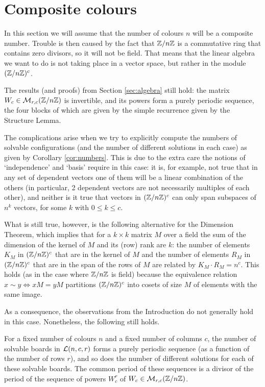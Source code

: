 \section{Composite colours}\label{sec:comp}
In this section we will assume that the number of colours $n$
will be a composite number. Trouble is then caused by the fact
that $\mathbb{Z}/n\mathbb{Z}$ is a commutative ring that contains zero divisors,
so it will not be field. That means that the linear algebra we
want to do is not taking place in a vector space, but rather
in the module $(\mathbb{Z}/n\mathbb{Z})^c$.

The results (and proofs) from Section \ref{sec:algebra} still hold:
the matrix $W_c\in\mathcal{M}_{r,c}(\mathbb{Z}/n\mathbb{Z})$ is invertible, and its
powers form a purely periodic sequence, the four blocks of which
are given by the simple recurrence given by the Structure Lemma.

The complications arise when we try to explicitly compute
the numbers of solvable configurations (and the number of
different solutions in each case) as given by Corollary \ref{cor:numbers}.
This is due to the extra care the notions of `independence'
and `basis' require in this case: it is, for example, not true that
in any set of dependent vectors one of them will be a linear combination
of the others (in particular, 2 dependent vectors are not
necessarily multiples of each other),
and neither is it true that vectors in $(\mathbb{Z}/n\mathbb{Z})^c$ can only span
subspaces of $n^k$ vectors, for some $k$ with $0\leq k\leq c$.

What is still true, however, is the following alternative for
the Dimension Theorem, which implies that for a $k\times k$
matrix $M$ over a field the sum of the dimension of the kernel
of $M$ and its (row) rank are $k$:
the number of elements $K_M$ in $(\mathbb{Z}/n\mathbb{Z})^c$ that are in the kernel
of $M$ and the number of elements $R_M$ in $(\mathbb{Z}/n\mathbb{Z})^c$ that are in the 
span of the rows of $M$ are related by $K_M\cdot R_M=n^c$.
This holds (as in the case where $\mathbb{Z}/n\mathbb{Z}$ is field) because
the equivalence relation $x \sim y\iff xM=yM$ partitions
$(\mathbb{Z}/n\mathbb{Z})^c$ into cosets of size $M$ of elements
with the same image.

As a consequence, the observations from the Introduction do not
generally hold in this case. Nonetheless, the following still holds.

\begin{theorem}
For a fixed number of colours $n$ and a fixed number of columns $c$,
the number of solvable boards in $\mathcal{L}(n, c, r)$ forms a purely periodic
sequence (as a function of the number of rows $r$), and so does the
number of different solutions for each of these solvable boards.
The common period of these sequences is a divisor of the period of the sequence
of powers $W_c^r$ of $W_c\in\mathcal{M}_{r,c}(\mathbb{Z}/n\mathbb{Z})$.
\end{theorem}


